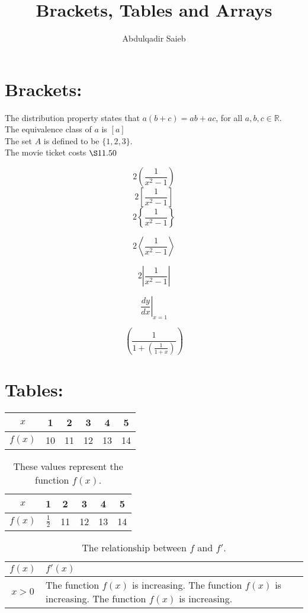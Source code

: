 \documentclass[11pt]{article}
\title{Brackets, Tables and Arrays}
\author{Abdulqadir Saieb}
\begin{document}
\maketitle

\section{Brackets:}
The distribution property states that $a(b+c)=ab+ac$, for all $a, b, c \in \mathbb{R}$.\\[6pt]
The equivalence class of $a$ is $[a]$\\[6pt]
The set $A$ is defined to be $\{1,2,3\}$.\\[6pt]
The movie ticket costs $\S11.50$

$$2\left(\frac{1}{x^2-1}\right)$$
$$2\left[\frac{1}{x^2-1}\right]$$
$$2\left\{\frac{1}{x^2-1}\right\}$$

$$2\left\langle\frac{1}{x^2-1}\right\rangle$$

$$2\left|\frac{1}{x^2-1}\right|$$

$$\left.\frac{dy}{dx}\right|_{x=1}$$

$$\left(\frac{1}{1+\left(\frac{1}{1+x}\right)}\right)$$

\section{Tables:}

\begin{tabular}{|c||c|c|c|c|c|}\hline
$x$ & 1 & 2 & 3 & 4 & 5\\\hline
$f(x)$ & 10 & 11 & 12 & 13 & 14\\\hline

\end{tabular}

\vspace{1cm}

\begin{table}[H]
\centering
\def\arraystretch{1.5}
\begin{tabular}{|c||c|c|c|c|c|}\hline
$x$ & 1 & 2 & 3 & 4 & 5\\\hline
$f(x)$ & $\frac{1}{2}$ & 11 & 12 & 13 & 14\\\hline

\end{tabular}
\caption{These values represent the function
$f(x)$.}
\end{table}


\begin{table}[H]
\centering
\caption{The relationship between $f$ and $f'$.}
\def\arraystretch{1.5}
\begin{tabular}{|c|p{3in}|}
\hline
$f(x)$ & $f'(x)$\\
\hline

$x>0$ & The function $f(x)$ is increasing.
The function $f(x)$ is increasing.
The function $f(x)$ is increasing.\\
\hline

\end{tabular}
\end{table}
\end{document}
